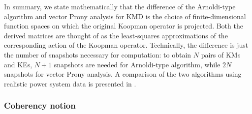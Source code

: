 \documentclass[a4paper,10pt]{article}
\begin{document}
%
In summary, we state mathematically that the difference of the Arnoldi-type algorithm and vector Prony analysis for KMD is the choice of finite-dimensional function spaces on which the original Koopman operator is projected.  
Both the derived matrices are thought of as the least-squares approximations of the corresponding action of the Koopman operator.  
Technically, the difference is just the number of snapshots necessary for computation: to obtain $N$ pairs of KMs and KEs, $N+1$ snapshots are needed for Arnoldi-type algorithm, while $2N$ snapshots for vector Prony analysis.  
A comparison of the two algorithms using realistic power system data is presented in \cite{Raak_CDC16}.


\subsubsection{Coherency notion}
\label{subsec:KM-coherency}
\end{document}
